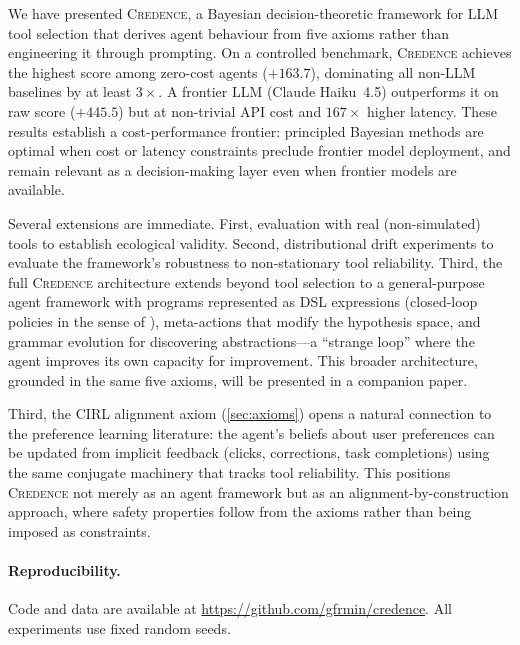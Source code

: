 \documentclass[11pt]{article}
\newcommand{\credence}{\textsc{Credence}}
\begin{document}
We have presented \credence{}, a Bayesian decision-theoretic framework for LLM tool selection that derives agent behaviour from five axioms rather than engineering it through prompting. On a controlled benchmark, \credence{} achieves the highest score among zero-cost agents ($+163.7$), dominating all non-LLM baselines by at least $3\times$. A frontier LLM (Claude Haiku~4.5) outperforms it on raw score ($+445.5$) but at non-trivial API cost and $167\times$ higher latency. These results establish a cost-performance frontier: principled Bayesian methods are optimal when cost or latency constraints preclude frontier model deployment, and remain relevant as a decision-making layer even when frontier models are available.

Several extensions are immediate. First, evaluation with real (non-simulated) tools to establish ecological validity. Second, distributional drift experiments to evaluate the framework's robustness to non-stationary tool reliability. Third, the full \credence{} architecture extends beyond tool selection to a general-purpose agent framework with programs represented as DSL expressions (closed-loop policies in the sense of \citealt{sutton1999between}), meta-actions that modify the hypothesis space, and grammar evolution for discovering abstractions---a ``strange loop'' where the agent improves its own capacity for improvement. This broader architecture, grounded in the same five axioms, will be presented in a companion paper.

Third, the CIRL alignment axiom (\cref{sec:axioms}) opens a natural connection to the preference learning literature: the agent's beliefs about user preferences can be updated from implicit feedback (clicks, corrections, task completions) using the same conjugate machinery that tracks tool reliability. This positions \credence{} not merely as an agent framework but as an alignment-by-construction approach, where safety properties follow from the axioms rather than being imposed as constraints.

\paragraph{Reproducibility.} Code and data are available at \url{https://github.com/gfrmin/credence}. All experiments use fixed random seeds.



\end{document}

